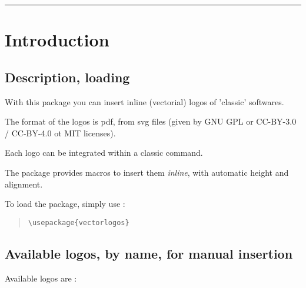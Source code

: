 \documentclass[11pt,a4paper]{ltxdoc}
\begin{document}
\medskip

\hrule

\vspace*{5mm}

\pagebreak


\hypertarget{matoc}{}

\tableofcontents

\vspace*{5mm}


\pagebreak

\section{Introduction}

\subsection{Description, loading}

With this package you can insert inline (vectorial) logos of 'classic' softwares.

The format of the logos is \textsf{pdf}, from \textsf{svg} files (given by \textsf{GNU GPL} or \textsf{CC-BY-3.0 / CC-BY-4.0} ot \textsf{MIT} licenses).

\medskip

Each logo can be integrated within a classic  command.

The package provides macros to insert them \textit{inline}, with automatic height and alignment.

\medskip

To load the package, simply use :

\begin{quote}
\begin{verbatim}
\usepackage{vectorlogos}
\end{verbatim}
\end{quote}

\subsection{Available logos, by name, for manual insertion}

Available logos are :

\medskip
\end{document}
